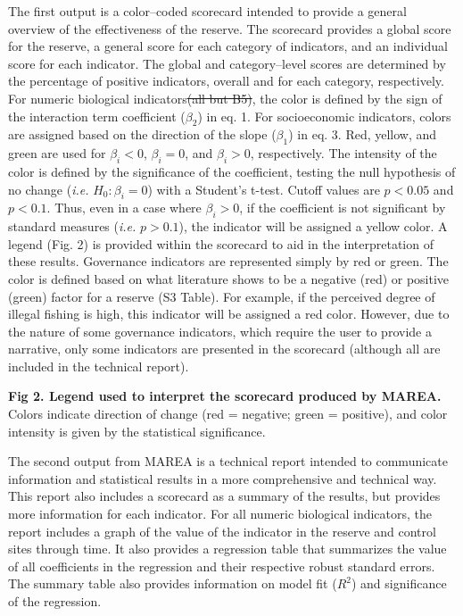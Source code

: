 \documentclass[12pt,]{article}
\providecommand{\DIFdeltex}[1]{{\protect\color{red}\sout{#1}}}                      %
\providecommand{\DIFdelbegin}{} %
\providecommand{\DIFdelend}{} %
\providecommand{\DIFdel}[1]{\texorpdfstring{\DIFdeltex{#1}}{}} %
\newcommand{\DIFscaledelfig}{0.5}
\newlength{\DIFdelgraphicswidth} %
\newlength{\DIFdelgraphicsheight} %
\newcommand{\DIFdelincludegraphics}[2][]{%
\sbox{\DIFdelgraphicsbox}{\DIFOincludegraphics[#1]{#2}}%
\settoboxwidth{\DIFdelgraphicswidth}{\DIFdelgraphicsbox} %
\settoboxtotalheight{\DIFdelgraphicsheight}{\DIFdelgraphicsbox} %
\scalebox{\DIFscaledelfig}{%
\parbox[b]{\DIFdelgraphicswidth}{\usebox{\DIFdelgraphicsbox}\\[-\baselineskip] \rule{\DIFdelgraphicswidth}{0em}}\llap{\resizebox{\DIFdelgraphicswidth}{\DIFdelgraphicsheight}{%
\setlength{\unitlength}{\DIFdelgraphicswidth}%
\begin{picture}(1,1)%
\thicklines\linethickness{2pt} %
{\color[rgb]{1,0,0}\put(0,0){\framebox(1,1){}}}%
{\color[rgb]{1,0,0}\put(0,0){\line( 1,1){1}}}%
{\color[rgb]{1,0,0}\put(0,1){\line(1,-1){1}}}%
\end{picture}%
}\hspace*{3pt}}} %
} %
\DeclareRobustCommand{\DIFdelbegin}{\DIFOdelbegin \let\includegraphics\DIFdelincludegraphics} %
\DeclareRobustCommand{\DIFdelend}{\DIFOaddend \let\includegraphics\DIFOincludegraphics} %
\begin{document}
The first output is a color--coded scorecard intended to provide a
general overview of the effectiveness of the reserve. The scorecard
provides a global score for the reserve, a general score for each
category of indicators, and an individual score for each indicator. The
global and category--level scores are determined by the percentage of
positive indicators, overall and for each category, respectively. For
numeric biological indicators\DIFdelbegin \DIFdel{(all but B5)}\DIFdelend , the color is defined by the sign of the
interaction term coefficient (\(\beta_2\)) in eq. 1. For socioeconomic
indicators, colors are assigned based on the direction of the slope
(\(\beta_1\)) in eq. 3. Red, yellow, and green are used for
\(\beta_i<0\), \(\beta_i = 0\), and \(\beta_i>0\), respectively. The
intensity of the color is defined by the significance of the
coefficient, testing the null hypothesis of no change (\emph{i.e.}
\(H_0: \beta_i = 0\)) with a Student's t-test. Cutoff values are
\(p < 0.05\) and \(p < 0.1\). Thus, even in a case where
\(\beta_i > 0\), if the coefficient is not significant by standard
measures (\emph{i.e. } \(p>0.1\)), the indicator will be assigned a
yellow color. A legend (Fig. 2) is provided within the scorecard to aid
in the interpretation of these results. Governance indicators are
represented simply by red or green. The color is defined based on what
literature shows to be a negative (red) or positive (green) factor for a
reserve (S3 Table). For example, if the perceived degree of illegal
fishing is high, this indicator will be assigned a red color. However,
due to the nature of some governance indicators, which require the user
to provide a narrative, only some indicators are presented in the
scorecard (although all are included in the technical report).

\textbf{Fig 2. Legend used to interpret the scorecard produced by
MAREA.} Colors indicate direction of change (red = negative; green =
positive), and color intensity is given by the statistical significance.

The second output from MAREA is a technical report intended to
communicate information and statistical results in a more comprehensive
and technical way. This report also includes a scorecard as a summary of
the results, but provides more information for each indicator. For all
numeric biological indicators, the report includes a graph of the value
of the indicator in the reserve and control sites through time. It also
provides a regression table that summarizes the value of all
coefficients in the regression and their respective robust standard
errors. The summary table also provides information on model fit
(\(R^2\)) and significance of the regression.
\end{document}
